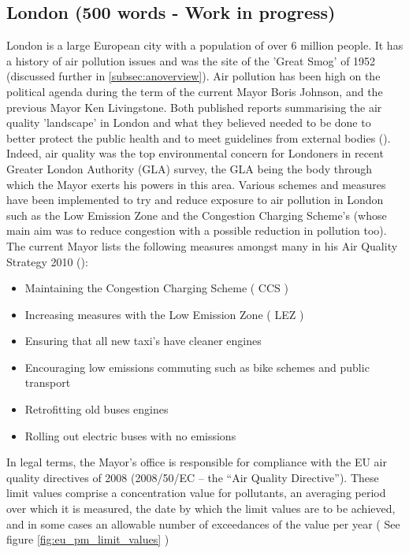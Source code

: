 \subsection{London (500 words - Work in progress)}
\label{subsec:london}

London is a large European city with a population of over 6 million people. It has a history of air pollution issues and was the site of the 'Great Smog' of 1952 (discussed further in \ref{subsec:anoverview}). Air pollution has been high on the political agenda during the term of the current Mayor Boris Johnson, and the previous Mayor Ken Livingstone. Both published reports summarising the air quality 'landscape' in London and what they believed needed to be done to better protect the public health and to meet guidelines from external bodies (\cite{GreaterLondonAuthorityGLA2002, GreaterLondonAuthorityGLA2010}). Indeed, air quality was the top environmental concern for Londoners in recent Greater London Authority (GLA) survey, the GLA being the body through which the Mayor exerts his powers in this area.  Various schemes and measures have been implemented to try and reduce exposure to air pollution in London such as the Low Emission Zone and the Congestion Charging Scheme's (whose main aim was to reduce congestion with  a possible reduction in pollution too). The current Mayor lists the following measures amongst many in his Air Quality Strategy 2010 (\cite{GreaterLondonAuthorityGLA2010}):

\begin{itemize}
\item Maintaining the Congestion Charging Scheme ( CCS )
\item Increasing measures with the Low Emission Zone ( LEZ )
\item Ensuring that all new taxi's have cleaner engines
\item Encouraging low emissions commuting such as bike schemes and public transport
\item Retrofitting old buses engines
\item Rolling out electric buses with no emissions
\end{itemize}

In legal terms, the Mayor’s office is responsible for compliance with the EU air quality directives of 2008 (2008/50/EC – the “Air Quality Directive”). These limit values comprise a concentration value for pollutants, an averaging period over which it is measured, the date by which the limit values are to be achieved, and in some cases an allowable number of exceedances of the value per year ( See figure \ref{fig:eu_pm_limit_values} )

